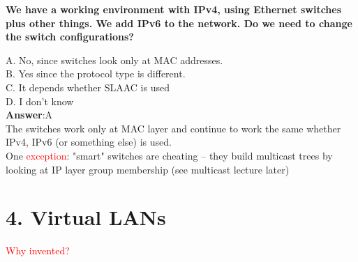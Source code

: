 \documentclass[11pt]{article}
\begin{document}
\begin{tcolorbox}[
  colback=gray!15,     %
  colframe=black!50,    %
  boxrule=1pt,       %
  arc=3mm,             %
  left=4mm, right=4mm, top=2mm, bottom=2mm %
]
\textbf{We have a working environment with IPv4, using Ethernet
switches plus other things. We add IPv6 to the network. Do we
need to change the switch configurations?}

\vspace{0.3cm}

A. No, since switches look only at MAC addresses. \\
B. Yes since the protocol type is different. \\
C. It depends whether SLAAC is used \\
D. I don't know  \\

\textbf{Answer}:A \\

The switches work only at MAC layer and continue to work the same whether IPv4, IPv6 (or something else) is used. \\

One \textcolor{red}{exception}: "smart" switches are cheating -- they build multicast trees by looking at IP layer group membership (see multicast lecture later)
\end{tcolorbox}

\section*{4. Virtual LANs}

\textcolor{red}{Why invented?}
\end{document}
